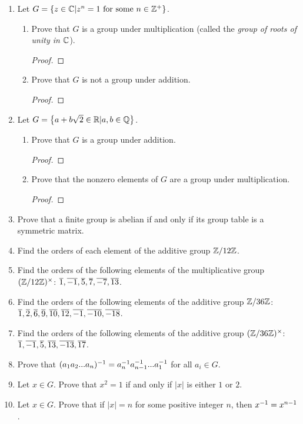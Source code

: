 \begin{enumerate}
\begin{proof}
		\end{proof}
		\item Let $G = \left\{z\in \mathbb{C} | z^n = 1 \text{ for some }n\in\mathbb{Z}^+ \right\}$.
		\begin{enumerate}
			\item Prove that $G$ is a group under multiplication (called the \emph{group of roots of unity in $\mathbb{C}$}).
			\begin{proof}
			\end{proof}
			\item Prove that $G$ is not a group under addition.
			\begin{proof}
			\end{proof}
		\end{enumerate}
		\item Let $G = \left\{ a+b\sqrt{2}\in\mathbb{R}|a,b\in\mathbb{Q} \right\}$.
		\begin{enumerate}
			\item Prove that $G$ is a group under addition.
			\begin{proof}
			\end{proof}
			\item Prove that the nonzero elements of $G$ are a group under multiplication.
			\begin{proof}
			\end{proof}
		\end{enumerate}
		\item Prove that a finite group is abelian if and only if its group table is a symmetric matrix.
		\item Find the orders of each element of the additive group $\mathbb{Z}/12\mathbb{Z}$.
		\item Find the orders of the following elements of the multiplicative group $(\mathbb{Z}/12\mathbb{Z})^\times$: $\overline{1},\overline{-1},\overline{5},\overline{7},\overline{-7},\overline{13}$.
		\item Find the orders of the following elements of the additive group $\mathbb{Z}/36\mathbb{Z}$: $\overline{1},\overline{2},\overline{6},\overline{9},\overline{10},\overline{12},\overline{-1},\overline{-10},\overline{-18}$.
		\item Find the orders of the following elements of the additive group $(\mathbb{Z}/36\mathbb{Z})^\times$: $\overline{1},\overline{-1},\overline{5},\overline{13},\overline{-13},\overline{17}$.
		\item Prove that $(a_1a_2...a_n)^{-1} = a_n^{-1} a_{n-1}^{-1} ... a_1^{-1}$ for all $a_i\in G$.
		\item Let $x\in G$.  Prove that $x^2=1$ if and only if $|x|$ is either $1$ or $2$.
		\item Let $x\in G$.  Prove that if $|x| = n$ for some positive integer $n$, then $x^{-1} = x^{n-1}$.

\end{enumerate}
